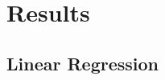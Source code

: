 \documentclass[preprint]{acm_proc_article-sp}
\begin{document}
%
%
%


\section{Results}


\subsection{Linear Regression}

%
%
\end{document}
